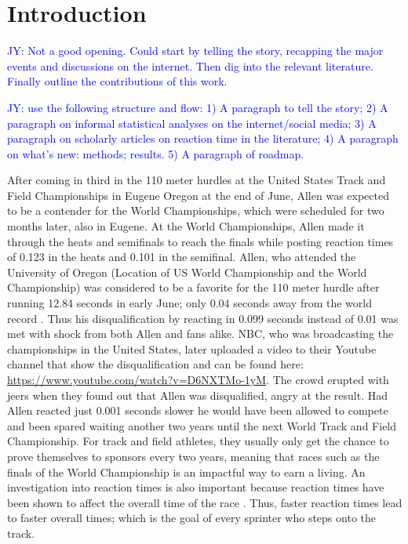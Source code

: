 \documentclass[12pt, letterpaper, titlepage]{article}
\newcommand{\jy}[1]{\textcolor{blue}{JY: #1}}
\begin{document}
\section{Introduction}
\label{sec:intro}


\jy{Not a good opening. Could start by telling the story, recapping the major
  events and discussions on the internet. Then dig into the relevant
  literature. Finally outline the contributions of this work.
}


\jy{use the following structure and flow:
  1) A paragraph to tell the story;
  2) A paragraph on informal statistical analyses on the internet/social media;
  3) A paragraph on scholarly articles on reaction time in the literature;
  4) A paragraph on what's new: methods; results.
  5) A paragraph of roadmap.}


After coming in third in the 110 meter hurdles at the United States Track and 
Field Championships in Eugene Oregon at the end of June, Allen was expected to 
be a contender for the World Championships, which were scheduled for two months 
later, also in Eugene. At the World Championships, Allen made it through the 
heats and semifinals to reach the finals while posting reaction times of 0.123
in the heats and 0.101 in the semifinal.  Allen, who attended the University
of Oregon (Location of US World Championship and the World Championship) was
considered to be a favorite for the 110 meter hurdle after running 12.84 seconds
in early June; only 0.04 seconds away from the world record \citep{Preview}.
Thus his disqualification by reacting in 0.099 seconds instead of 0.01 was met
with shock from both Allen and fans alike.  NBC, who was broadcasting the
championships in the United States, later uploaded a video to their Youtube
channel that show the disqualification and can be found here:
\url{https://www.youtube.com/watch?v=D6NXTMo-1yM}. The crowd erupted with jeers when
they found out that Allen was disqualified, angry at the result.  Had Allen 
reacted just 0.001 seconds slower he would have been allowed to compete and been 
spared waiting another two years until the next World Track and Field Championship.
For track and field athletes, they usually only get the chance to prove 
themselves to sponsors every two years, meaning that races such as the finals
of the World Championship is an impactful way to earn a living. An 
investigation into reaction times is also important because reaction times have
been shown to affect the overall time of the race \citep{delalija2008reaction}.
Thus, faster reaction times lead to faster overall times; which is the goal of
every sprinter who steps onto the track.
\end{document}
